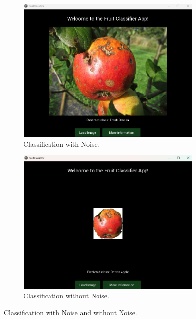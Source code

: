\documentclass[conference]{IEEEtran}
\begin{document}
\begin{figure}[h]
    \centering
    \begin{subfigure}[b]{0.48\linewidth}
        \centering
        \includegraphics[width=\linewidth]{Apple with noise.png}
        \caption{Classification with Noise.}
        \label{figFA}
    \end{subfigure}
    \hfill
    \begin{subfigure}[b]{0.48\linewidth}
        \centering
        \includegraphics[width=\linewidth]{Apple processed.png}
        \caption{Classification without Noise.}
        \label{figFB}
    \end{subfigure}
    \caption{Classification with Noise and without Noise.}
    \label{FigNoise}
\end{figure}
\end{document}
